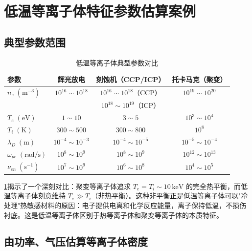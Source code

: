 \section{低温等离子体特征参数估算案例}

\subsection{典型参数范围}

\begin{table}[htbp]
\centering
\caption{低温等离子体典型参数对比}
\label{tab:plasma-params}
\begin{tabular}{lccc}
\toprule
\textbf{参数} & \textbf{辉光放电} & \textbf{刻蚀机（CCP/ICP）} & \textbf{托卡马克（聚变）} \\
\midrule
$n_e\;(\mathrm{m^{-3}})$ & $10^{16}\sim 10^{18}$ & $10^{16}\sim 10^{18}$（CCP）& $10^{19}\sim 10^{20}$ \\
& & $10^{18}\sim 10^{19}$（ICP）& \\
$T_e\;(\mathrm{eV})$ & $1\sim 10$ & $3\sim 5$ & $10^3\sim 10^4$ \\
$T_i\;(\mathrm{K})$ & $300\sim 500$ & $300\sim 800$ & $10^8$ \\
$\lambda_D\;(\mathrm{m})$ & $10^{-4}\sim 10^{-3}$ & $10^{-4}\sim 10^{-5}$ & $10^{-5}\sim 10^{-4}$ \\
$\omega_{pe}\;(\mathrm{rad/s})$ & $10^8\sim 10^9$ & $10^8\sim 10^9$ & $10^{12}\sim 10^{13}$ \\
$\nu_{en}\;(\mathrm{s^{-1}})$ & $10^7\sim 10^9$ & $10^6\sim 10^8$ & $10^4\sim 10^5$ \\
\bottomrule
\end{tabular}
\end{table}

\begin{insight}{}{}
\cref{tab:plasma-params}揭示了一个深刻对比：聚变等离子体追求 $T_e = T_i \sim 10\,\mathrm{keV}$ 的完全热平衡，而低温等离子体刻意维持 $T_e \gg T_i$（非热平衡）。这种非平衡正是低温等离子体可以"冷处理"热敏感材料的原因：电子提供电离和化学反应能量，离子保持低温，不损伤衬底。这是低温等离子体区别于热等离子体和聚变等离子体的本质特征。
\end{insight}

\subsection{由功率、气压估算等离子体密度}

